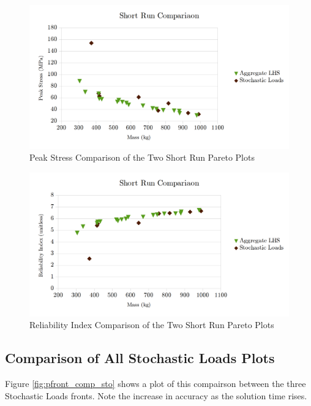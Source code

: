\begin{figure}[!htb]
\includegraphics[width=\textwidth]{img/pf_comp_short.png}
\caption{Peak Stress Comparison of the Two Short Run Pareto Plots}
\label{fig:pfront_comp_short}
\end{figure}

\begin{figure}[!htb]
\includegraphics[width=\textwidth]{img/pf_comp_short_beta.png}
\caption{Reliability Index Comparison of the Two Short Run Pareto Plots}
\label{fig:pfront_comp_short_beta}
\end{figure}
\subsection{Comparison of All Stochastic Loads Plots}
Figure \ref{fig:pfront_comp_sto} shows a plot of this compairson between the three Stochastic Loads fronts. Note the increase in accuracy as the solution time rises. 

